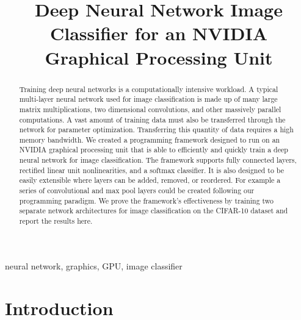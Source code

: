 \documentclass[conference]{IEEEtran}
\begin{document}
\title{Deep Neural Network Image Classifier for an NVIDIA Graphical Processing Unit}

\author{ 
}


\maketitle

\begin{abstract}
Training deep neural networks is a computationally intensive workload. A typical multi-layer neural network used for image classification is made up of many large matrix multiplications, two dimensional convolutions, and other massively parallel computations. A vast amount of training data must also be transferred through the network for parameter optimization. Transferring this quantity of data requires a high memory bandwidth. We created a programming framework designed to run on an NVIDIA graphical processing unit that is able to efficiently and quickly train a deep neural network for image classification. The framework supports fully connected layers, rectified linear unit nonlinearities, and a softmax classifier. It is also designed to be easily extensible where layers can be added, removed, or reordered. For example a series of convolutional and max pool layers could be created following our programming paradigm. We prove the framework's effectiveness by training two separate network architectures for image classification on the CIFAR-10 dataset and report the results here.
\end{abstract}

\begin{IEEEkeywords}
neural network, graphics, GPU, image classifier
\end{IEEEkeywords}

\section{Introduction}
\end{document}
